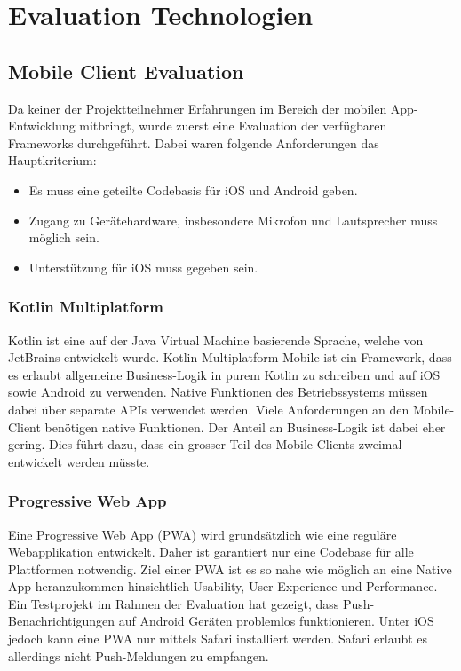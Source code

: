\section{Evaluation Technologien}\label{sec:evaluation-technologien}

\subsection{Mobile Client Evaluation}\label{subsec:mobile-client-eval}

Da keiner der Projektteilnehmer Erfahrungen im Bereich der mobilen App-Entwicklung mitbringt, wurde zuerst eine Evaluation der verfügbaren Frameworks durchgeführt.
Dabei waren folgende Anforderungen das Hauptkriterium:
\begin{itemize}
    \item Es muss eine geteilte Codebasis für iOS und Android geben.
    \item Zugang zu Gerätehardware, insbesondere Mikrofon und Lautsprecher muss möglich sein.
    \item Unterstützung für iOS muss gegeben sein.
\end{itemize}

\subsubsection*{Kotlin Multiplatform}
Kotlin ist eine auf der Java Virtual Machine basierende Sprache, welche von JetBrains entwickelt wurde.
Kotlin Multiplatform Mobile ist ein Framework, dass es erlaubt allgemeine Business-Logik in purem Kotlin zu schreiben und auf iOS sowie Android zu verwenden.
Native Funktionen des Betriebssystems müssen dabei über separate APIs verwendet werden.\cite{kotlin-platform-specific-APIs}
Viele Anforderungen an den Mobile-Client benötigen native Funktionen.
Der Anteil an Business-Logik ist dabei eher gering.
Dies führt dazu, dass ein grosser Teil des Mobile-Clients zweimal entwickelt werden müsste.

\subsubsection*{Progressive Web App}
Eine Progressive Web App (PWA) wird grundsätzlich wie eine reguläre Webapplikation entwickelt.
Daher ist garantiert nur eine Codebase für alle Plattformen notwendig.
Ziel einer PWA ist es so nahe wie möglich an eine Native App heranzukommen hinsichtlich Usability, User-Experience und Performance.\cite{what-are-PWAS}
Ein Testprojekt im Rahmen der Evaluation hat gezeigt, dass Push-Benachrichtigungen auf Android Geräten problemlos funktionieren.
Unter iOS jedoch kann eine PWA nur mittels Safari installiert werden.
Safari erlaubt es allerdings nicht Push-Meldungen zu empfangen.\cite{canIUsePush,iOSSupportPush}

